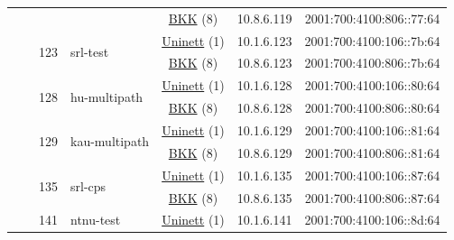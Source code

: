 \begin{small}
\begin{center}
\begin{longtable}{|c|c|c|c|c|c|c|c|}
  &  &  &  & \multicolumn{2}{|c|}{\tiny{\href{http://bkk.no}{BKK} (8)}} & \tiny{10.8.6.119} & \tiny{2001:700:4100:806::77:64} \\* \cline{3-3}\cline{4-4}\cline{5-5}\cline{6-6}\cline{7-7}\cline{8-8}
  &  & \multirow{2}{*}{\tiny{123}} & \multicolumn{1}{|l|}{\multirow{2}{*}{\tiny{srl-test}}} & \multicolumn{2}{|c|}{\tiny{\href{https://www.uninett.no}{Uninett} (1)}} & \tiny{10.1.6.123} & \tiny{2001:700:4100:106::7b:64} \\* \cline{5-5}\cline{6-6}\cline{7-7}\cline{8-8}
  &  &  &  & \multicolumn{2}{|c|}{\tiny{\href{http://bkk.no}{BKK} (8)}} & \tiny{10.8.6.123} & \tiny{2001:700:4100:806::7b:64} \\* \cline{3-3}\cline{4-4}\cline{5-5}\cline{6-6}\cline{7-7}\cline{8-8}
  &  & \multirow{2}{*}{\tiny{128}} & \multicolumn{1}{|l|}{\multirow{2}{*}{\tiny{hu-multipath}}} & \multicolumn{2}{|c|}{\tiny{\href{https://www.uninett.no}{Uninett} (1)}} & \tiny{10.1.6.128} & \tiny{2001:700:4100:106::80:64} \\* \cline{5-5}\cline{6-6}\cline{7-7}\cline{8-8}
  &  &  &  & \multicolumn{2}{|c|}{\tiny{\href{http://bkk.no}{BKK} (8)}} & \tiny{10.8.6.128} & \tiny{2001:700:4100:806::80:64} \\* \cline{3-3}\cline{4-4}\cline{5-5}\cline{6-6}\cline{7-7}\cline{8-8}
  &  & \multirow{2}{*}{\tiny{129}} & \multicolumn{1}{|l|}{\multirow{2}{*}{\tiny{kau-multipath}}} & \multicolumn{2}{|c|}{\tiny{\href{https://www.uninett.no}{Uninett} (1)}} & \tiny{10.1.6.129} & \tiny{2001:700:4100:106::81:64} \\* \cline{5-5}\cline{6-6}\cline{7-7}\cline{8-8}
  &  &  &  & \multicolumn{2}{|c|}{\tiny{\href{http://bkk.no}{BKK} (8)}} & \tiny{10.8.6.129} & \tiny{2001:700:4100:806::81:64} \\* \cline{3-3}\cline{4-4}\cline{5-5}\cline{6-6}\cline{7-7}\cline{8-8}
  &  & \multirow{2}{*}{\tiny{135}} & \multicolumn{1}{|l|}{\multirow{2}{*}{\tiny{srl-cps}}} & \multicolumn{2}{|c|}{\tiny{\href{https://www.uninett.no}{Uninett} (1)}} & \tiny{10.1.6.135} & \tiny{2001:700:4100:106::87:64} \\* \cline{5-5}\cline{6-6}\cline{7-7}\cline{8-8}
  &  &  &  & \multicolumn{2}{|c|}{\tiny{\href{http://bkk.no}{BKK} (8)}} & \tiny{10.8.6.135} & \tiny{2001:700:4100:806::87:64} \\* \cline{3-3}\cline{4-4}\cline{5-5}\cline{6-6}\cline{7-7}\cline{8-8}
  &  & \multirow{2}{*}{\tiny{141}} & \multicolumn{1}{|l|}{\multirow{2}{*}{\tiny{ntnu-test}}} & \multicolumn{2}{|c|}{\tiny{\href{https://www.uninett.no}{Uninett} (1)}} & \tiny{10.1.6.141} & \tiny{2001:700:4100:106::8d:64} \\* \cline{5-5}\cline{6-6}\cline{7-7}\cline{8-8}

\end{longtable}
\end{center}
\end{small}
